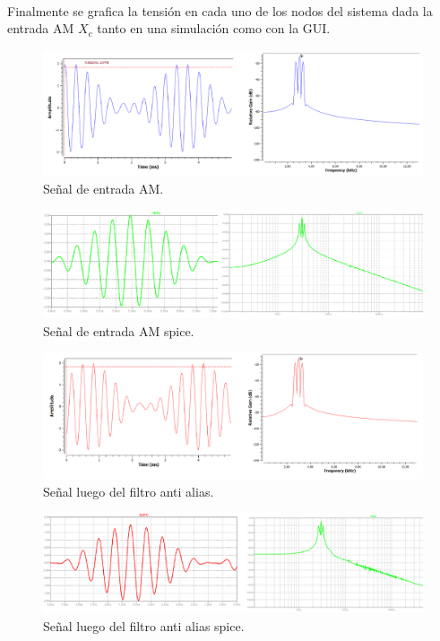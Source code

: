 \\
Finalmente se grafica la tensión en cada uno de los nodos del sistema dada la entrada AM $X_c$ tanto en una simulación como con la GUI.
\begin{figure}[H]
	\centering
	\includegraphics[width=1\textwidth]{ImagenesEjercicio7/input.PNG}
\caption{Señal de entrada AM.}
	\label{fig:input}
\end{figure}
\begin{figure}[H]
	\centering
	\includegraphics[width=1\textwidth]{ImagenesEjercicio7/sinput.PNG}
\caption{Señal de entrada AM spice.}
	\label{fig:sinput}
\end{figure}

\begin{figure}[H]
	\centering
	\includegraphics[width=1\textwidth]{ImagenesEjercicio7/alias.PNG}
\caption{Señal luego del filtro anti alias.}
	\label{fig:alias}
\end{figure}


\begin{figure}[H]
	\centering
	\includegraphics[width=1\textwidth]{ImagenesEjercicio7/salias.PNG}
\caption{Señal luego del filtro anti alias spice.}
	\label{fig:salias}
\end{figure}

